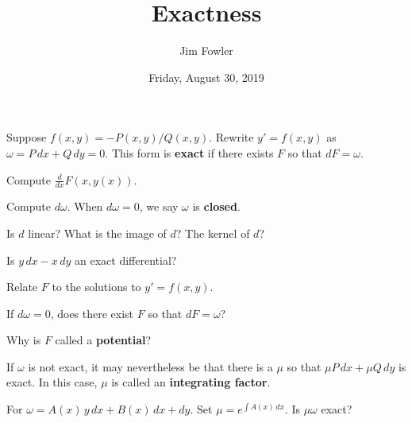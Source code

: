 \documentclass{homework}
\author{Jim Fowler}
\title{Exactness}
\date{Friday, August 30, 2019}
\begin{document}
\maketitle

Suppose $f(x,y) = -P(x,y)/Q(x,y)$.  Rewrite $y' = f(x,y)$ as
$\omega = P \, dx + Q \, dy = 0$.  This form is \textbf{exact} if
there exists $F$ so that $dF = \omega$.

\begin{problem}
  Compute $\frac{d}{dx} F(x, y(x))$.
\end{problem}

\vfill

\begin{problem}
  Compute $d\omega$.  When $d\omega = 0$, we say $\omega$ is \textbf{closed}.
\end{problem}

\vfill

\begin{problem}
  Is $d$ linear?  What is the image of $d$?  The kernel of $d$?
\end{problem}

\vfill

\begin{problem}
  Is $y \, dx - x \, dy$ an exact differential?
\end{problem}

\vfill

\begin{problem}
  Relate $F$ to the solutions to $y' = f(x,y)$.
\end{problem}

\vfill

\begin{problem}
  If $d\omega = 0$, does there exist $F$ so that $dF = \omega$?
\end{problem}

\vfill

\begin{problem}
  Why is $F$ called a \textbf{potential}?
\end{problem}

\vfill

\begin{problem}
  If $\omega$ is not exact, it may nevertheless be that there is a $\mu$ so that $\mu P \, dx + \mu Q \, dy$ is exact.  In this case, $\mu$ is called an \textbf{integrating factor}.

  For $\omega = A(x) \, y \, dx + B(x) \, dx + dy$.  Set $\mu  = e^{\int A(x) \, dx}$.  Is $\mu \omega$ exact?
\end{problem}
\end{document}

